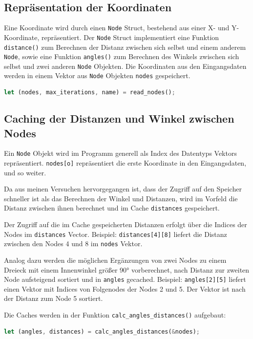\documentclass[a4paper,10pt,ngerman]{scrartcl}
\begin{document}
\subsection{Repräsentation der Koordinaten}
Eine Koordinate wird durch einen \lstinline{Node} Struct, bestehend aus einer X- und Y-Koordinate, repräsentiert. Der \lstinline{Node} Struct implementiert eine Funktion \lstinline{distance()} zum Berechnen der Distanz zwischen sich selbst und einem anderem \lstinline{Node}, sowie eine Funktion \lstinline{angles()} zum Berechnen des Winkels zwischen sich selbst und zwei anderen \lstinline{Node} Objekten. Die Koordinaten aus den Eingangsdaten werden in einem Vektor aus \lstinline{Node} Objekten \lstinline{nodes} gespeichert. 
\lstset{style=boxed}
\begin{lstlisting}[language=Rust]
    let (nodes, max_iterations, name) = read_nodes();
\end{lstlisting}
\lstset{style=reference}

\subsection{Caching der Distanzen und Winkel zwischen Nodes} \label{angles_distances}
Ein \lstinline{Node} Objekt wird im Programm generell als Index des Datentyps Vektors repräsentiert. \lstinline{nodes[o]} repräsentiert die erste Koordinate in den Eingangsdaten, und so weiter.

Da aus meinen Versuchen hervorgegangen ist, dass der Zugriff auf den Speicher schneller ist als das Berechnen der Winkel und Distanzen, wird im Vorfeld die Distanz zwischen ihnen berechnet und im Cache \lstinline{distances} gespeichert. 

Der Zugriff auf die im Cache gespeicherten Distanzen erfolgt über die Indices der Nodes im \lstinline{distances} Vector.
Beispiel: \lstinline{distances[4][8]} liefert die Distanz zwischen den Nodes 4 und 8 im \lstinline{nodes} Vektor.

Analog dazu werden die möglichen Ergänzungen von zwei Nodes zu einem Dreieck mit einem Innenwinkel größer 90° vorberechnet, nach Distanz zur zweiten Node aufsteigend sortiert und in \lstinline{angles} gecached.
Beispiel: \lstinline{angles[2][5]} liefert einen Vektor mit Indices von Folgenodes der Nodes 2 und 5. Der Vektor ist nach der Distanz zum Node 5 sortiert.

Die Caches werden in der Funktion \lstinline{calc_angles_distances()} aufgebaut:
\lstset{style=boxed}
\begin{lstlisting}[language=Rust]
    let (angles, distances) = calc_angles_distances(&nodes);
\end{lstlisting}
\lstset{style=reference}
\end{document}
